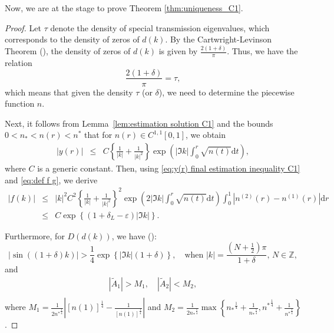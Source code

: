 \documentclass[11pt,reqno]{amsart}
\theoremstyle{definition}
\theoremstyle{remark}
\numberwithin{equation}{section}
\begin{document}

Now, we are at the stage to prove Theorem \ref{thm:uniqueness_C1}.~

\begin{proof}
Let $\tau$ denote the density of special transmission eigenvalues, which corresponds to the density of zeros of $d(k)$. By the Cartwright-Levinson Theorem (\cite{CCH16}), the density of zeros of $d(k)$ is given by $\frac{2(1+\delta)}{\pi}$. Thus, we have the relation
\begin{equation*}
	\frac{2(1+\delta)}{\pi} = \tau,
\end{equation*}
which means that given the density $\tau$ (or $\delta$), we need to determine the piecewise function $n$.	
	
Next, it follows from Lemma~\ref{lem:estimation solution C1} and the bounds $0 < n_{*} < n(r) < n^{*}$ that for $n(r) \in C^{1,1}[0,1]$, we obtain
\begin{eqnarray}\label{eq:y(r) final estimation inequality C1}
		\left|y(r)\right| & \leq & C\left\{\frac{1}{|k|}+\frac{1}{|k|^2} \right\}\exp\left(\left|\Im k\right|\int_{0}^{r}\sqrt{n(t)}\mathrm{d} t\right),
\end{eqnarray}
where $C$ is a generic constant. Then, using \eqref{eq:y(r) final estimation inequality C1} and \eqref{eq:def f g}, we derive
\begin{eqnarray*}
		\left|f(k)\right|& \leq & |k|^2C^2\left\{\frac{1}{|k|}+\frac{1}{|k|^2} \right\}^2\exp\left(2\left|\Im k\right|\int_{0}^{r}\sqrt{n(t)}\mathrm{d} t\right)\int_0^1\left|n^{(2)}(r)-n^{(1)}(r)\right|\mathrm{d}r \nonumber\\
		&\leq & C\exp\left\{(1+\delta_L-\varepsilon)\left|\Im k\right|\right\}.
\end{eqnarray*}
	
Furthermore, for $D(d(k))$, we have (\cite{MP94}):
\begin{equation*}
	\left|\sin((1+\delta)k) \right| > \frac{1}{4}\exp\left\{\left|\Im k\right|\left(1+\delta\right) \right\}, \quad \text{when } |k| = \frac{\left(N+\frac{1}{2}\right)\pi}{1+\delta}, \, N \in \mathbb{Z},
\end{equation*}
and
\begin{equation}\label{eq:estimation of A_1 and A_2}
	\begin{aligned}
		\left|\tilde{A}_1\right|>M_1,\quad	\left|\tilde{A}_2\right|<{M}_2,\\
	\end{aligned}
\end{equation}
where $M_1=\frac{1}{2{n^{*}}^{\frac{1}{4}}}\left|{[n(1)]}^{\frac{1}{4}}-\frac{1}{{[n(1)]}^{\frac{1}{4}}}\right|$ and $M_2=\frac{1}{2{n_{*}}^{\frac{1}{4}}}\max{\left\{{n_{*}}^{\frac{1}{4}}+\frac{1}{{n_{*}}^{\frac{1}{4}}},{n^{*}}^{\frac{1}{4}}+\frac{1}{{n^{*}}^{\frac{1}{4}}} \right\} }$.


\end{proof}
\end{document}
